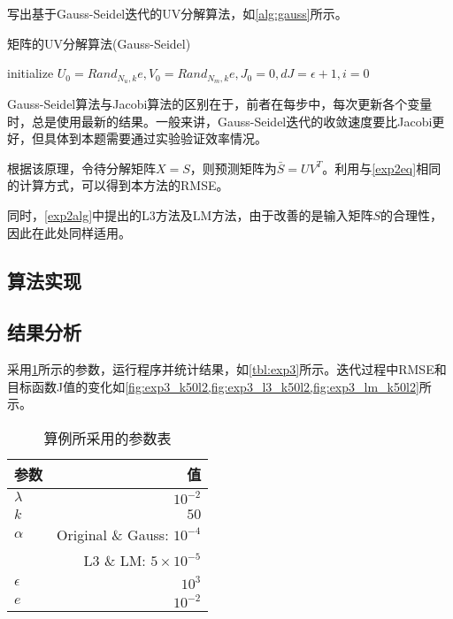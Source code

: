 \documentclass[a4paper,12pt]{article}
\begin{document}
    写出基于Gauss-Seidel迭代的UV分解算法，如\cref{alg:gauss}所示。
    \begin{algorithm}
        \caption{矩阵的UV分解算法(Gauss-Seidel)}
        \label{alg:gauss}

        initialize $U_0=Rand_{N_u,k}e, V_0=Rand_{N_m,k}e, J_0=0, dJ = \epsilon + 1, i=0$\;
    \end{algorithm}

    Gauss-Seidel算法与Jacobi算法的区别在于，前者在每步中，每次更新各个变量时，总是使用最新的结果。一般来讲，Gauss-Seidel迭代的收敛速度要比Jacobi更好，但具体到本题需要通过实验验证效率情况。

    根据该原理，令待分解矩阵$X=S$，则预测矩阵为$\bar S=UV^T$。利用与\cref{exp2eq}相同的计算方式，可以得到本方法的RMSE。

    同时，\cref{exp2alg}中提出的L3方法及LM方法，由于改善的是输入矩阵$S$的合理性，因此在此处同样适用。
    \subsection{算法实现}

    \subsection{结果分析}
    采用\cref{tbl:exp3para}所示的参数，运行程序并统计结果，如\cref{tbl:exp3}所示。迭代过程中RMSE和目标函数J值的变化如\cref{fig:exp3_k50l2,fig:exp3_l3_k50l2,fig:exp3_lm_k50l2}所示。

    \begin{table}
      \centering
      \caption{算例所采用的参数表}
      \label{tbl:exp3para}
      \begin{tabular}{lr}
        \toprule
        参数&值\\
        \midrule
        $\lambda$ & $10^{-2}$ \\
        $k$ & $50$ \\
        $\alpha$ & Original \& Gauss: $10^{-4}$\\
         & L3 \& LM: $5\times 10^{-5}$ \\
        $\epsilon$ & $10^{3}$ \\
        $e$ & $10^{-2}$ \\
        \bottomrule
      \end{tabular}
    \end{table}
\end{document}
